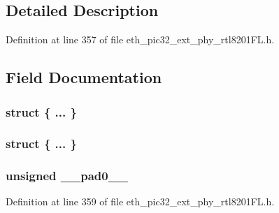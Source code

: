 \subsection{Detailed Description}


Definition at line 357 of file eth\+\_\+pic32\+\_\+ext\+\_\+phy\+\_\+rtl8201\+F\+L.\+h.



\subsection{Field Documentation}
\hypertarget{union___c_u_s_t_o_m_i_z_e_d_l_e_d_s__t_a725bcbad52ac9db5b8f37fce5c5ceb53}{}\subsubsection[{"@148}]{\setlength{\rightskip}{0pt plus 5cm}struct \{ ... \} }\label{union___c_u_s_t_o_m_i_z_e_d_l_e_d_s__t_a725bcbad52ac9db5b8f37fce5c5ceb53}
\hypertarget{union___c_u_s_t_o_m_i_z_e_d_l_e_d_s__t_abeb65059878184517a3b629478ee6631}{}\subsubsection[{"@150}]{\setlength{\rightskip}{0pt plus 5cm}struct \{ ... \} }\label{union___c_u_s_t_o_m_i_z_e_d_l_e_d_s__t_abeb65059878184517a3b629478ee6631}
\hypertarget{union___c_u_s_t_o_m_i_z_e_d_l_e_d_s__t_adf71f3d8410c1f1dbbc96680a92c49af}{}
\subsubsection[{\+\_\+\+\_\+pad0\+\_\+\+\_\+}]{\setlength{\rightskip}{0pt plus 5cm}unsigned \+\_\+\+\_\+pad0\+\_\+\+\_\+}\label{union___c_u_s_t_o_m_i_z_e_d_l_e_d_s__t_adf71f3d8410c1f1dbbc96680a92c49af}


Definition at line 359 of file eth\+\_\+pic32\+\_\+ext\+\_\+phy\+\_\+rtl8201\+F\+L.\+h.

\hypertarget{union___c_u_s_t_o_m_i_z_e_d_l_e_d_s__t_acaf2d0924a107ec6e8d2e31febaf66f9}{}

